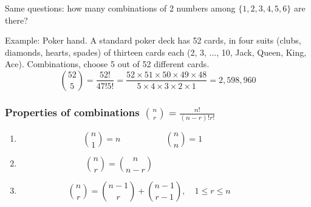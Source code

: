 \documentclass[slidestop,compress,mathserif]{beamer}
\begin{document}
\begin{frame}

Same questions: how many combinations of 2 numbers among $\{1, 2, 3, 4, 5, 6\}$ are there?



\end{frame}

\begin{frame}%
Example: Poker hand. A standard poker deck has 52 cards, in four suits (clubs, diamonds, hearts, spades) of thirteen cards each (2, 3, ..., 10, Jack, Queen, King, Ace).
\pause
Combinations, choose 5 out of 52 different cards.
\[
{52 \choose 5} = \frac{52!}{47!5!} = \frac{52 \times 51 \times 50 \times 49 \times 48}{5 \times 4 \times 3 \times 2 \times 1} = 2,598,960
\]
\end{frame}



\begin{frame}\frametitle{Properties of combinations ${n \choose r} = \frac{n!}{(n-r)!r!}$}

\begin{enumerate}
\item
\[{n \choose 1} = n ~~~~~~~~~~~~~~~~~~~~~~~~ {n \choose n} = 1~~~~~~~~~~~~ ~~~~~~~~~~~~\]
\pause
\item
\[{n \choose r} = {n \choose n - r} ~~~~~~~~~~~~~~~~~~~~~~~~~~~~~~~~~~~~~~~~~~~~~~~~~\]
\pause
\item
\[
{n \choose r} = {n-1 \choose r} + {n-1 \choose r-1}, \quad 1\leq r \leq n ~~~~~~~~~~~~~~~~~
\]
\end{enumerate}
\end{frame}
\end{document}

